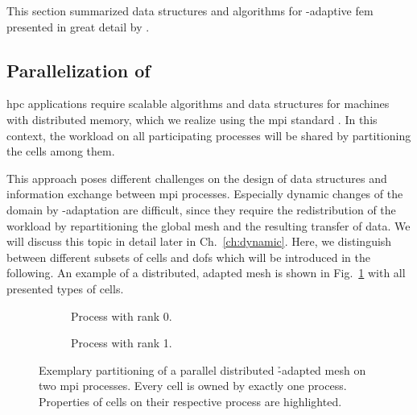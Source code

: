 This section summarized data structures and algorithms for \hp-adaptive \gls{fem} presented in great detail by \textcite{bangerth2009}.





\subsection{Parallelization of }

\Gls{hpc} applications require scalable algorithms and data structures for machines with distributed memory, which we realize using the \gls{mpi} standard \textcite{mpi31}. In this context, the workload on all participating processes will be shared by partitioning the cells among them.

This approach poses different challenges on the design of data structures and information exchange between \gls{mpi} processes. Especially dynamic changes of the domain by \hp-adaptation are difficult, since they require the redistribution of the workload by repartitioning the global mesh and the resulting transfer of data. We will discuss this topic in detail later in Ch.~\ref{ch:dynamic}. Here, we distinguish between different subsets of cells and \glspl{dof} which will be introduced in the following. An example of a distributed, adapted mesh is shown in Fig.~\ref{fig:paralleldistribution} with all presented types of cells.

\begin{figure}
\begin{subfigure}[t]{.35\textwidth}
  \centering
  
  \caption{Process with rank 0.}
\end{subfigure}
\begin{subfigure}[t]{.35\textwidth}
  \centering
  
  \caption{Process with rank 1.}
\end{subfigure}
\begin{minipage}[t]{.28\textwidth}
  \centering
  
\end{minipage}
\caption[Partitioning of a parallel distributed \h-adapted mesh.]{Exemplary partitioning of a parallel distributed \h-adapted mesh on two \gls{mpi} processes. Every cell is owned by exactly one process. Properties of cells on their respective process are highlighted.}
\label{fig:paralleldistribution}
\end{figure}

